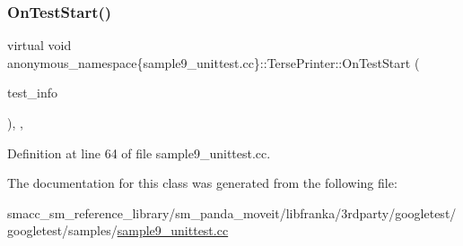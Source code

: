 \subsubsection{\texorpdfstring{On\+Test\+Start()}{OnTestStart()}}
{\footnotesize\ttfamily virtual void anonymous\+\_\+namespace\{sample9\+\_\+unittest.\+cc\}\+::Terse\+Printer\+::\+On\+Test\+Start (\begin{DoxyParamCaption}\item[{const Test\+Info \&}]{test\+\_\+info }\end{DoxyParamCaption})\hspace{0.3cm}{\ttfamily [inline]}, {\ttfamily [private]}, {\ttfamily [virtual]}}



Definition at line 64 of file sample9\+\_\+unittest.\+cc.




The documentation for this class was generated from the following file\+:\begin{DoxyCompactItemize}
\item 
smacc\+\_\+sm\+\_\+reference\+\_\+library/sm\+\_\+panda\+\_\+moveit/libfranka/3rdparty/googletest/googletest/samples/\hyperlink{sample9__unittest_8cc}{sample9\+\_\+unittest.\+cc}\end{DoxyCompactItemize}
